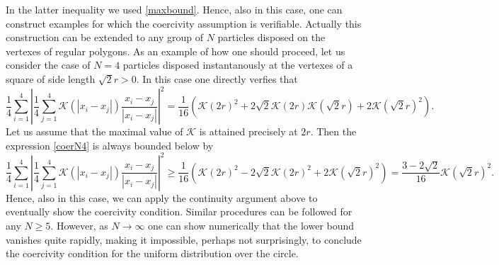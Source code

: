 In the latter inequality we used \eqref{maxbound}. Hence, also in this case, one can construct examples for which the coercivity assumption is verifiable. Actually this construction can be extended to any group of $N$ particles disposed on the vertexes of regular polygons. As an example of how one should proceed, let us consider the case of $N=4$ particles disposed instantanously at the vertexes of a square of side length $\sqrt{2} r>0$. In this case one directly verfies that
\begin{equation}\label{coerN4}
\frac{1}{4} \sum_{i=1}^4 \left | \frac{1}{4} \sum_{j=1}^4 \mathcal K(|x_i-x_j|) \frac{x_i-x_j}{|x_i-x_j|} \right |^2 = \frac{1}{16} ( \mathcal K(2 r)^2 + 2 \sqrt{2} \mathcal K(2 r) \mathcal K(\sqrt 2 r) + 2 \mathcal K(\sqrt 2 r)^2 ).
\end{equation}
Let us assume that the maximal value of $\mathcal K$ is attained precisely at $2 r$. Then the expression \eqref{coerN4} is always bounded below by
$$
\frac{1}{4} \sum_{i=1}^4 \left | \frac{1}{4} \sum_{j=1}^4 \mathcal K(|x_i-x_j|) \frac{x_i-x_j}{|x_i-x_j|} \right |^2  \geq \frac{1}{16} ( \mathcal K(2 r)^2 - 2 \sqrt{2} \mathcal K(2 r)^2 + 2 \mathcal K(\sqrt 2 r)^2 ) = \frac{3 -2 \sqrt 2}{16} \mathcal K(\sqrt 2 r)^2.
$$
Hence, also in this case, we can apply the continuity argument above to eventually show the coercivity condition. Similar procedures can be followed for any $N \geq 5$. However, as $N \to \infty$ one can show numerically that the lower bound vanishes quite rapidly, making it impossible, perhaps not surprisingly, to conclude the coercivity condition for the uniform distribution over the circle.
\\

